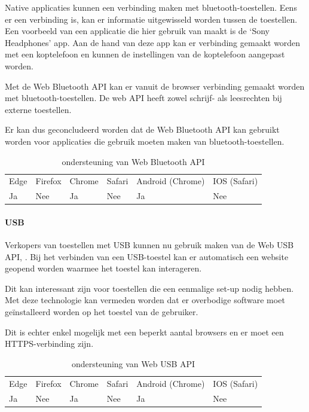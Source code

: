 Native applicaties kunnen een verbinding maken met bluetooth-toestellen. Eens er een verbinding is, kan er informatie uitgewisseld worden tussen de toestellen. Een voorbeeld van een applicatie die hier gebruik van maakt is de ‘Sony Headphones’ app. Aan de hand van deze app kan er verbinding gemaakt worden met een koptelefoon en kunnen de instellingen van de koptelefoon aangepast worden.

Met de Web Bluetooth API \autocite{Grant2020} kan er vanuit de browser verbinding gemaakt worden met bluetooth-toestellen. De web API heeft zowel schrijf- als leesrechten bij externe toestellen. 

Er kan dus geconcludeerd worden dat de Web Bluetooth API kan gebruikt worden voor applicaties die gebruik moeten maken van bluetooth-toestellen.

\autocite{Beaufort2019a}

\begin{table}[H]
	\centering
	\begin{tabular}{llllll}
		Edge & Firefox & Chrome & Safari & Android (Chrome) & IOS (Safari) \\
		Ja   & Nee      & Ja     & Nee     & Ja               & Nee          
	\end{tabular}	
	\caption{ondersteuning van Web Bluetooth API}
	\label{ondersteuning van Web Bluetooth API}
\end{table}



\paragraph{USB}

Verkopers van toestellen met USB kunnen nu gebruik maken van de Web USB API, \autocite{Rockot2020}. Bij het verbinden van een USB-toestel kan er automatisch een website geopend worden waarmee het toestel kan interageren.
 
Dit kan interessant zijn voor toestellen die een eenmalige set-up nodig hebben. Met deze technologie kan vermeden worden dat er overbodige software moet geïnstalleerd worden op het toestel van de gebruiker. 

Dit is echter enkel mogelijk met een beperkt aantal browsers en er moet een HTTPS-verbinding zijn.

\autocite{Beaufort2019b}

\begin{table}[H]
	\centering
	\begin{tabular}{llllll}
		Edge & Firefox & Chrome & Safari & Android (Chrome) & IOS (Safari) \\
		Ja   & Nee      & Ja     & Nee     & Ja               & Nee          
	\end{tabular}	
	\caption{ondersteuning van Web USB API}
	\label{ondersteuning van Web USB API}
\end{table}


